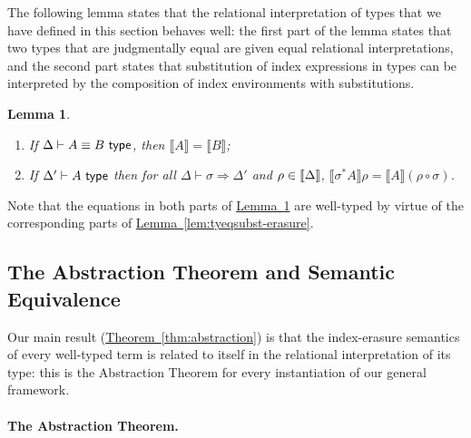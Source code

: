 \documentclass{sigplanconf}
\newcommand{\isType}{\textup{\textsf{ type}}}
\newcommand{\rsem}[1]{\llbracket #1 \rrbracket}
\newtheorem{lemma}{Lemma}
\newcommand{\lemref}[1]{\hyperref[#1]{Lemma~\ref*{#1}}}
\newcommand{\thmref}[1]{\hyperref[#1]{Theorem~\ref*{#1}}}
\theoremstyle{examplestyle}
\theoremstyle{restatementstyle}
\begin{document}
The following lemma states that the relational interpretation of types
that we have defined in this section behaves well: the first part of
the lemma states that two types that are judgmentally equal are given
equal relational interpretations, and the second part states that
substitution of index expressions in types can be interpreted by the
composition of index environments with 
substitutions.
\begin{lemma}\label{lem:tyeqsubst-relational}
\par
  \begin{enumerate}
  \item If $\Delta \vdash A \equiv B \isType$, then $\rsem{A} =  \rsem{B}$;
  \item If $\Delta' \vdash A \isType$ then for all $\Delta \vdash \sigma \Rightarrow
    \Delta'$ and $\rho \in \llbracket \Delta \rrbracket$,
    $\rsem{\sigma^*A} \rho = \rsem{A}(\rho \circ \sigma)$.
  \end{enumerate}
\end{lemma}
\noindent
Note that the equations in both parts of
\lemref{lem:tyeqsubst-relational} are well-typed by virtue of the
corresponding parts of \lemref{lem:tyeqsubst-erasure}.



\subsection{The Abstraction Theorem and Semantic Equivalence}
\label{sec:abstraction-theorem}

Our main result
(\thmref{thm:abstraction}) is that the index-erasure semantics of
every well-typed term is related to itself in the relational
interpretation of its type: this is the Abstraction Theorem for every
instantiation of our general framework.

\paragraph{The Abstraction Theorem.}
\end{document}
